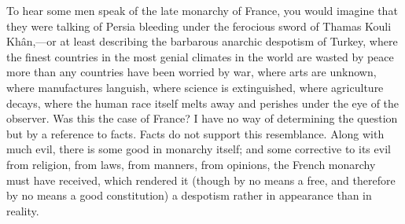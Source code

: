 To hear some men speak of the late monarchy of France, you would imagine that they were talking of Persia bleeding under the ferocious sword of Thamas Kouli Khân,—or at least describing the barbarous anarchic despotism of Turkey, where the finest countries in the most genial climates in the world are wasted by peace more than any countries have been worried by war, where arts are unknown, where manufactures languish, where science is extinguished, where agriculture decays, where the human race itself melts away and perishes under the eye of the observer. Was this the case of France? I have no way of determining the question but by a reference to facts. Facts do not support this resemblance. Along with much evil, there is some good in monarchy itself; and some corrective to its evil from religion, from laws, from manners, from opinions, the French monarchy must have received, which rendered it (though by no means a free, and therefore by no means a good constitution) a despotism rather in appearance than in reality.

